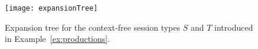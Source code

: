 \begin{figure}[h]
\centering
	\texttt{[image: expansionTree]}
	\caption{Expansion tree for the context-free session types $S$ and $T$
	introduced in Example~\ref{ex:productions}.}
	\label{fig:expansionTree}
\end{figure}

